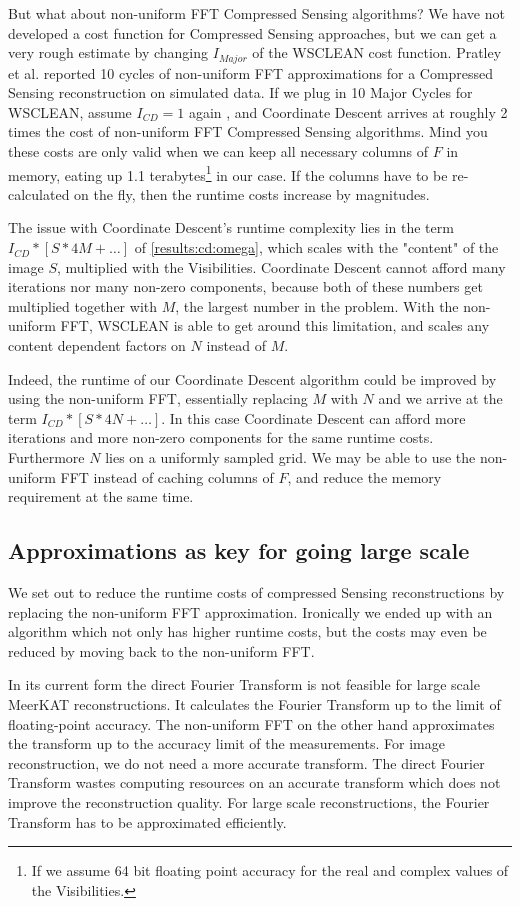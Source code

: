 But what about non-uniform FFT Compressed Sensing algorithms? We have not developed a cost function for Compressed Sensing approaches, but we can get a very rough estimate by changing $I_{Major}$ of the WSCLEAN cost function. Pratley et al.\cite{pratley2018fast} reported 10 cycles of non-uniform FFT approximations for a Compressed Sensing reconstruction on simulated data. If we plug in 10 Major Cycles for WSCLEAN, assume $I_{CD}=1$ again , and Coordinate Descent arrives at roughly 2 times the cost of non-uniform FFT Compressed Sensing algorithms. Mind you these costs are only valid when we can keep all necessary columns of $F$ in memory, eating up 1.1 terabytes\footnote{If we assume 64 bit floating point accuracy for the real and complex values of the Visibilities.} in our case. If the columns have to be re-calculated on the fly, then the runtime costs increase by magnitudes.

The issue with Coordinate Descent's runtime complexity lies in the term $I_{CD} * [S * 4M +\ldots]$ of \eqref{results:cd:omega}, which scales with the "content" of the image $S$, multiplied with the Visibilities. Coordinate Descent cannot afford many iterations nor many non-zero components, because both of these numbers get multiplied together with $M$, the largest number in the problem. With the non-uniform FFT, WSCLEAN is able to get around this limitation, and scales any content dependent factors on $N$ instead of $M$. 

Indeed, the runtime of our Coordinate Descent algorithm could be improved by using the non-uniform FFT, essentially replacing $M$ with $N$ and we arrive at the term $I_{CD} * [S * 4N +\ldots]$. In this case Coordinate Descent can afford more iterations and more non-zero components for the same runtime costs. Furthermore $N$ lies on a uniformly sampled grid. We may be able to use the non-uniform FFT instead of caching columns of $F$, and reduce the memory requirement at the same time.


\subsection{Approximations as key for going large scale}
We set out to reduce the runtime costs of compressed Sensing reconstructions by replacing the non-uniform FFT approximation. Ironically we ended up with an algorithm which not only has higher runtime costs, but the costs may even be reduced by moving back to the non-uniform FFT.

In its current form the direct Fourier Transform is not feasible for large scale MeerKAT reconstructions. It calculates the Fourier Transform up to the limit of floating-point accuracy. The non-uniform FFT on the other hand approximates the transform up to the accuracy limit of the measurements\cite{pratley2017robust}. For image reconstruction, we do not need a more accurate transform. The direct Fourier Transform wastes computing resources on an accurate transform which does not improve the reconstruction quality. For large scale reconstructions, the Fourier Transform has to be approximated efficiently.

